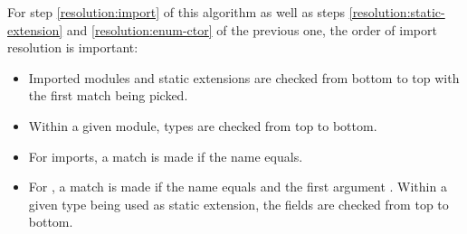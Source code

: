 For step \ref{resolution:import} of this algorithm as well as steps \ref{resolution:static-extension} and \ref{resolution:enum-ctor} of the previous one, the order of import resolution is important:

\begin{itemize}
	\item Imported modules and static extensions are checked from bottom to top with the first match being picked.
	\item Within a given module, types are checked from top to bottom.
	\item For imports, a match is made if the name equals.
	\item For , a match is made if the name equals and the first argument . Within a given type being used as static extension, the fields are checked from top to bottom.
\end{itemize}
